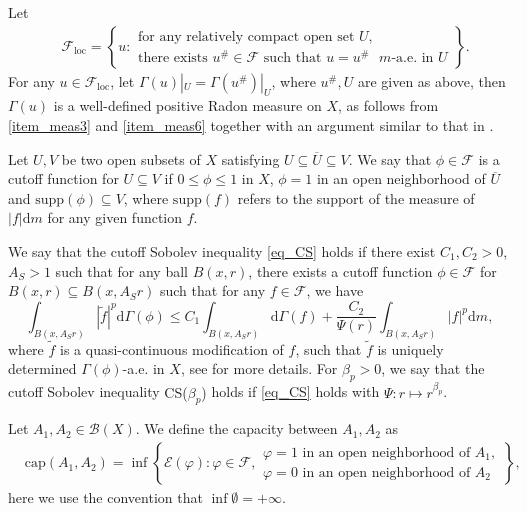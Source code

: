\documentclass[11pt,a4paper]{article}
\numberwithin{equation}{section}
\theoremstyle{plain}
\theoremstyle{definition}
\begin{document}
Let
\begin{align*}
&\mathcal{F}_{\mathrm{loc}}=\left\{u:
\begin{array}{l}
\text{for any relatively compact open set }U,\\
\text{there exists }u^\#\in \mathcal{F}\text{ such that }u=u^\#\text{ }m\text{-a.e. in }U
\end{array}
\right\}.
\end{align*}
For any $u\in \mathcal{F}_{\mathrm{loc}}$, let $\Gamma(u)|_U=\Gamma(u^\#)|_U$, where $u^\#, U$ are given as above, then $\Gamma(u)$ is a well-defined positive Radon measure on $X$, as follows from \ref{item_meas3} and \ref{item_meas6} together with an argument similar to that in \cite[Corollary 3.2.1]{FOT11}.

Let $U,V$ be two open subsets of $X$ satisfying $U\subseteq\overline{U}\subseteq V$. We say that $\phi\in\mathcal{F}$ is a cutoff function for $U\subseteq V$ if $0\le\phi\le1$ in $X$, $\phi=1$ in an open neighborhood of $\overline{U}$ and $\mathrm{supp}(\phi)\subseteq V$, where $\mathrm{supp}(f)$ refers to the support of the measure of $|f|\mathrm{d} m$ for any given function $f$.

We say that the cutoff Sobolev inequality \ref{eq_CS} holds if there exist $C_{1},C_{2}>0$, $A_{S}>1$ such that for any ball $B(x,r)$, there exists a cutoff function $\phi\in\mathcal{F}$ for $B(x,r)\subseteq B(x,A_Sr)$ such that for any $f\in\mathcal{F}$, we have
\begin{equation*}\label{eq_CS}\tag*{CS($\Psi$)}
\int_{B(x,A_{S}r)}|\widetilde{f}|^p\mathrm{d}\Gamma(\phi)\le C_{1}\int_{B(x,A_{S}r)}\mathrm{d}\Gamma(f)+\frac{C_{2}}{\Psi(r)}\int_{B(x,A_{S}r)}|f|^p\mathrm{d} m,
\end{equation*}
where $\widetilde{f}$ is a quasi-continuous modification of $f$, such that $\widetilde{f}$ is uniquely determined $\Gamma(\phi)$-a.e. in $X$, see \cite[Section 8]{Yan25a} for more details. For $\beta_p>0$, we say that the cutoff Sobolev inequality \hypertarget{eq_CSbeta}{CS($\beta_p$)} holds if \ref{eq_CS} holds with $\Psi:r\mapsto r^{\beta_p}$.

Let $A_1,A_2\in\mathcal{B}(X)$. We define the capacity between $A_1,A_2$ as
\begin{align*}
&\mathrm{cap}(A_1,A_2)=\inf\left\{\mathcal{E}(\varphi):\varphi\in\mathcal{F},
\begin{array}{l}
\varphi=1\text{ in an open neighborhood of }A_1,\\
\varphi=0\text{ in an open neighborhood of }A_2
\end{array}
\right\},
\end{align*}
here we use the convention that $\inf\emptyset=+\infty$.
\end{document}
